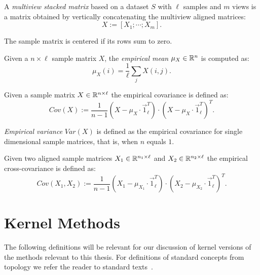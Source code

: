 \begin{definition}\label{def:notation:multiview_stacked_matrix}
A \emph{multiview stacked matrix} based on a dataset $S$ with $\ell$ samples and $m$ views is a matrix obtained by
vertically concatenating the multiview aligned matrices:
$$ X := \left[ X_1; \cdots ; X_m \right].$$
\end{definition}

\begin{definition}\label{def:notation:centered_matrix}
The sample matrix is centered if its rows sum to zero.
\end{definition}

\begin{definition}\label{def:notation:empirical_mean}
Given a $n\times\ell$ sample matrix $X$, the \emph{empirical mean} $\mu_X \in \mathbb{R}^n$ is computed as:
$$ \mu_X(i) = \frac{1}{\ell} \sum_j X(i,j).$$
\end{definition}

\begin{definition}\label{def:notation:empirical_covariance}
Given a sample matrix $X \in \mathbb{R}^{n \times \ell}$
 the empirical covariance is defined as:
$$ Cov(X) := \frac{1}{n-1}(X - \mu_{X} \cdot \vec{1}_\ell^T)\cdot(X - \mu_{X} \cdot \vec{1}_\ell^T)^T.$$
\end{definition}

\begin{definition}\label{def:notation:empirical_variance}
\emph{Empirical variance} $Var(X)$ is defined as the empirical covariance for single dimensional sample matrices, that is, when $n$ equals $1$.
\end{definition}

\begin{definition}\label{def:notation:empirical_cross_covariance}
Given two aligned sample matrices $X_1 \in \mathbb{R}^{n_1 \times \ell}$ and $X_2 \in \mathbb{R}^{n_2 \times \ell}$
 the empirical cross-covariance is defined as:
$$ Cov(X_1, X_2) := \frac{1}{n-1}(X_1 - \mu_{X_1} \cdot \vec{1}_\ell^T)\cdot(X_2 - \mu_{X_2} \cdot \vec{1}_\ell^T)^T.$$
\end{definition}


\section{Kernel Methods}
The following definitions will be relevant for our discussion of kernel versions of the methods relevant to this thesis. For definitions
of standard concepts from topology we refer the reader to standard texts~\cite{bourbaki1998general}.

